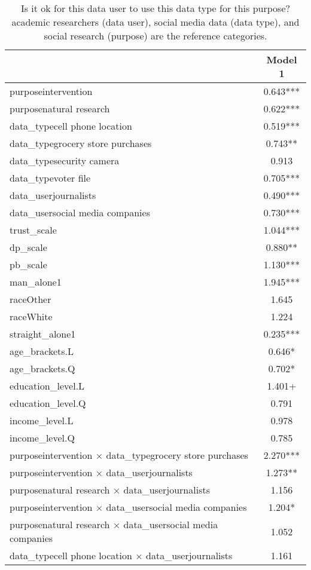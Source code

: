 \begin{table}

\caption{Is it ok for this data user to use this data type for this purpose? academic researchers (data user), social media data (data type), and social research (purpose) are the reference categories.}
\centering
\begin{tabular}[t]{lc}
\toprule
  & Model 1\\
\midrule
purposeintervention & \num{0.643}***\\
purposenatural research & \num{0.622}***\\
data\_typecell phone location & \num{0.519}***\\
data\_typegrocery store purchases & \num{0.743}**\\
data\_typesecurity camera & \num{0.913}\\
data\_typevoter file & \num{0.705}***\\
data\_userjournalists & \num{0.490}***\\
data\_usersocial media companies & \num{0.730}***\\
trust\_scale & \num{1.044}***\\
dp\_scale & \num{0.880}**\\
pb\_scale & \num{1.130}***\\
man\_alone1 & \num{1.945}***\\
raceOther & \num{1.645}\\
raceWhite & \num{1.224}\\
straight\_alone1 & \num{0.235}***\\
age\_brackets.L & \num{0.646}*\\
age\_brackets.Q & \num{0.702}*\\
education\_level.L & \num{1.401}+\\
education\_level.Q & \num{0.791}\\
income\_level.L & \num{0.978}\\
income\_level.Q & \num{0.785}\\
purposeintervention × data\_typegrocery store purchases & \num{2.270}***\\
purposeintervention × data\_userjournalists & \num{1.273}**\\
purposenatural research × data\_userjournalists & \num{1.156}\\
purposeintervention × data\_usersocial media companies & \num{1.204}*\\
purposenatural research × data\_usersocial media companies & \num{1.052}\\
data\_typecell phone location × data\_userjournalists & \num{1.161}\\

\end{tabular}
\end{table}

